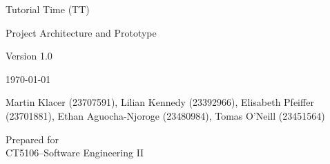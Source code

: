 \documentclass[12pt, a4paper]{article}
\begin{document}
\begin{titlepage}
    \centering
    \vspace*{4cm}
    {\Large Tutorial Time (TT)  \par}
    \vspace{2cm}
    {\Large Project Architecture and Prototype \par}
    \vspace{0.5cm}
    {\Large Version 1.0 \par}
    \vspace{0.5cm}
    {\Large \today \par}
    \vspace{2cm}
    {\Large Martin Klacer (23707591), Lilian Kennedy (23392966), Elisabeth Pfeiffer (23701881), Ethan Aguocha-Njoroge (23480984), Tomas O'Neill (23451564)\par}
    \vfill

    Prepared for\\
    CT5106--Software Engineering II\par

\end{titlepage}

\newpage












\end{document}
